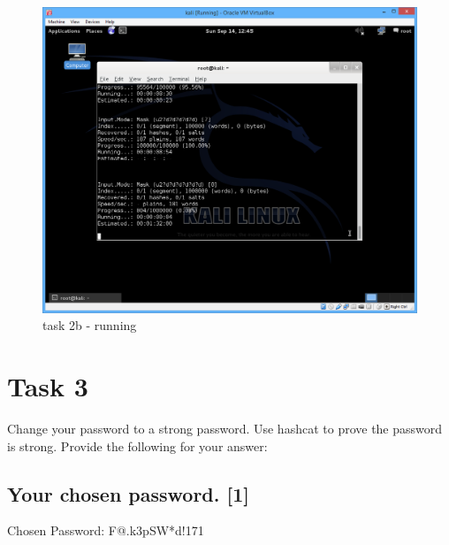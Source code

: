\documentclass[11pt,titlepage]{article}
\begin{document}
\begin{figure}[H]
\begin{center}
\includegraphics[scale=0.6]{task2b2.png}
\caption{task 2b - running}
\end{center}
\end{figure}

\section{Task 3}
Change  your  password  to  a  strong  password.  Use  hashcat  to  prove  the  password  is strong. Provide the following for your answer:
\subsection{Your chosen password. [1]}
Chosen Password: F@.k3pSW*d!171
\end{document}

